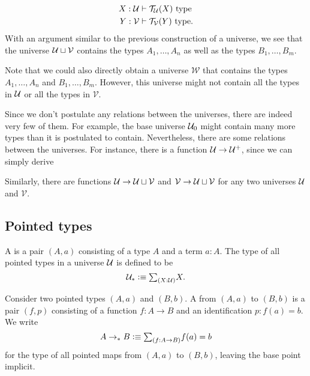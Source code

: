 \begin{rmk}
\begin{enumerate}
    \begin{align*}
      X:\UU & \vdash \mathcal{T}_{\mathcal{U}}(X)~\mathrm{type} \\
      Y:\mathcal{V} & \vdash \mathcal{T}_{\mathcal{V}}(Y) ~\mathrm{type}.
    \end{align*}
    With an argument similar to the previous construction of a universe, we see that the universe $\UU\sqcup\mathcal{V}$ contains the types $A_1,\ldots,A_n$ as well as the types $B_1,\ldots,B_m$.

    Note that we could also directly obtain a universe $\mathcal{W}$ that contains the types $A_1,\ldots,A_n$ and $B_1,\ldots,B_m$. However, this universe might not contain all the types in $\UU$ or all the types in $\mathcal{V}$.
  \end{enumerate}
  Since we don't postulate any relations between the universes, there are indeed very few of them. For example, the base universe $\UU_0$ might contain many more types than it is postulated to contain. Nevertheless, there are some relations between the universes. For instance, there is a function $\UU\to\UU^+$, since we can simply derive
  \begin{prooftree}
  \end{prooftree}
  Similarly, there are functions $\UU\to \UU\sqcup\mathcal{V}$ and $\mathcal{V}\to \UU\sqcup\mathcal{V}$ for any two universes $\UU$ and $\mathcal{V}$.
\end{rmk}

\subsection{Pointed types}

\begin{defn}
  A  is a pair $(A,a)$ consisting of a type $A$ and a term $a:A$. The type of all pointed types in a universe $\UU$ is defined to be
  \begin{equation*}
    \UU_\ast \defeq \sm{X:\UU}X.
  \end{equation*}
\end{defn}

\begin{defn}
  Consider two pointed types $(A,a)$ and $(B,b)$. A  from $(A,a)$ to $(B,b)$ is a pair $(f,p)$ consisting of a function $f:A\to B$ and an identification $p:f(a)=b$. We write
  \begin{equation*}
    A\to_\ast B \defeq \sm{f:A\to B}f(a)=b
  \end{equation*}
  for the type of all pointed maps from $(A,a)$ to $(B,b)$, leaving the base point implicit.
\end{defn}

